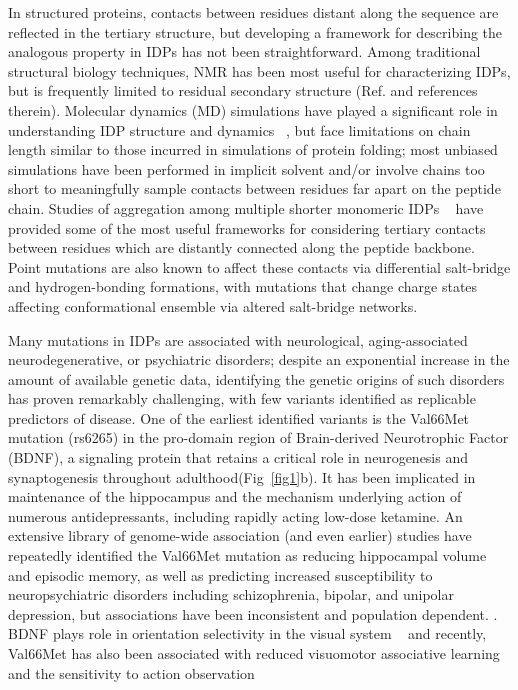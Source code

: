 \documentclass[journal=jacsat,manuscript=article]{achemso}
\begin{document}
In structured proteins, contacts between residues distant along the sequence are reflected in the tertiary structure, but developing a framework for describing the analogous property in IDPs has not been straightforward. Among traditional structural biology techniques, NMR has been most useful for characterizing IDPs, but is frequently limited to residual secondary structure (Ref. \cite{Mittag2007,Habchi2014} and references therein). Molecular dynamics (MD) simulations have played a significant role in understanding IDP structure and dynamics ~\cite{Stanley2015,Ithuralde2016,Knott2012b,Invernizzi2013,Abeln2008,Yedvabny2015,Levine2017a}, but face limitations on chain length similar to those incurred in simulations of protein folding; most unbiased simulations have been performed in implicit solvent and/or involve chains too short to meaningfully sample contacts between residues far apart on the peptide chain.  Studies of aggregation among multiple shorter monomeric IDPs ~\cite{Levine2015,Pappu2008}  have provided some of the most useful frameworks for considering tertiary contacts between residues which are distantly connected along the peptide backbone.  Point mutations are also known to affect these contacts via differential salt-bridge and hydrogen-bonding formations, with mutations that change charge states affecting conformational ensemble via altered salt-bridge networks. ~\cite{Levine2015} 

Many mutations in IDPs are associated with neurological, aging-associated neurodegenerative, or psychiatric disorders; despite an exponential increase in the amount of available genetic data, identifying the genetic origins of such disorders has proven remarkably challenging, with few variants identified as replicable predictors of disease.  %
One of the earliest identified variants is the Val66Met mutation (rs6265)  in the pro-domain region of Brain-derived Neurotrophic Factor (BDNF), \cite{Notaras2015} a signaling protein %
that retains a critical role in neurogenesis and synaptogenesis throughout adulthood(Fig~\ref{fig1}b).\cite{Korte1995} It has been implicated in maintenance of the hippocampus and the mechanism underlying action of numerous antidepressants, \cite{Autry2012,Bjorkholm2016} %
including rapidly acting low-dose ketamine.\cite{Autry2011}  An extensive library of genome-wide association (and even earlier) studies have repeatedly identified the Val66Met mutation as reducing hippocampal volume and episodic memory, as well as predicting increased susceptibility to neuropsychiatric disorders including schizophrenia, bipolar, and unipolar depression, but associations have been inconsistent and population dependent. \cite{soliman2010,Chen2008,Verhagen2010,Notaras2015, Autry2011}. BDNF plays role in orientation selectivity in the visual system ~\cite {Huang1999, Liu2011,Gao2014} and recently, Val66Met has also been associated with reduced visuomotor associative learning and the sensitivity to action observation \cite{Taschereau-Dumouchel2016} 
\end{document}
